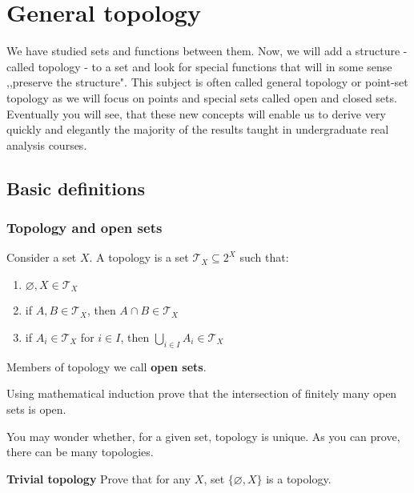 
\newcommand{\Int}{\text{Int\,}}
\newcommand{\Cl}{\text{Cl\,}}
\newcommand{\Ext}{\text{Ext\,}}
\newcommand{\Fr}{\text{Fr\,}}
\newcommand{\eps}{\varepsilon}

\chapter{General topology}
\label{general_topology}
We have studied sets and functions between them. Now, we will add
a structure - called topology - to a set and look for special
functions that will in some sense ,,preserve the structure". This
subject is often called general topology or point-set topology as
we will focus on points and special sets called open and closed sets.
Eventually you will see, that these new concepts will enable us
to derive very quickly and elegantly the majority of the results
taught in undergraduate real analysis courses.

\section{Basic definitions}
\subsection{Topology and open sets}
Consider a set $X$. A topology is a set $\mathcal{T}_X \subseteq 2^X $ such that:
\begin{enumerate}
	\item $\varnothing, X\in \mathcal{T}_X$
	\item if $A, B\in \mathcal{T}_X$, then $A\cap B\in \mathcal{T}_X$
	\item if $A_i\in \mathcal{T}_X$ for $i\in I$, then $\bigcup_{i\in I} A_i\in \mathcal T_X$
\end{enumerate}
Members of topology we call \textbf{open sets}.

\begin{prob}
	Using mathematical induction prove that the intersection of finitely many open sets is open.
\end{prob}

You may wonder whether, for a given set, topology is unique. As you can prove, there can be many topologies.

\begin{prob}
	\textbf{Trivial topology} Prove that for any $X$, set $\{\varnothing, X\}$ is a topology.
\end{prob}

